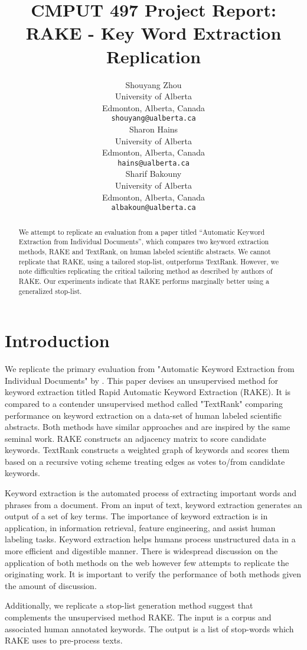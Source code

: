 \documentclass[11pt,a4paper]{article}
\title{CMPUT 497 Project Report: \\ RAKE - Key Word Extraction Replication}
\author{Shouyang Zhou \\
  University of Alberta \\
  Edmonton, Alberta, Canada \\
  {\tt shouyang@ualberta.ca} \\\And
  Sharon Hains \\
  University of Alberta \\
  Edmonton, Alberta, Canada \\
  {\tt hains@ualberta.ca} \\\And
  Sharif Bakouny\\
  University of Alberta \\
  Edmonton, Alberta, Canada \\
  {\tt albakoun@ualberta.ca} \\}
\date{}
\begin{document}
\maketitle

\begin{abstract}
We attempt to replicate an evaluation from a paper titled  “Automatic Keyword Extraction from Individual Documents”, which compares two keyword extraction methods, RAKE and TextRank, on human labeled scientific abstracts. We cannot replicate that RAKE, using a tailored stop-list, outperforms TextRank. However, we note difficulties replicating the critical tailoring method as described by authors of RAKE. Our experiments indicate that RAKE performs marginally better using a generalized stop-list. 	
\end{abstract}

\section{Introduction}

We replicate the primary evaluation from "Automatic Keyword Extraction from Individual Documents" by \citet{1}. This paper devises an unsupervised method for keyword extraction titled Rapid Automatic Keyword Extraction (RAKE). It is compared to a contender unsupervised method called "TextRank" comparing performance on keyword extraction on a data-set of human labeled scientific abstracts. Both methods have similar approaches and are inspired by the same seminal work. RAKE constructs an adjacency matrix to score candidate keywords. TextRank constructs a weighted graph of keywords and scores them based on a recursive voting scheme treating edges as votes to/from candidate keywords.

Keyword extraction is the automated process of extracting important words and phrases from a document. From an input of text, keyword extraction generates an output of a set of key terms. The importance of keyword extraction is in application, in information retrieval, feature engineering, and assist human labeling tasks. Keyword extraction helps humans process unstructured data in a more efficient and digestible manner. There is widespread discussion on the application of both methods on the web however few attempts to replicate the originating work. It is important to verify the performance of both methods given the amount of discussion.  

Additionally, we replicate a stop-list generation method \citet{1} suggest that complements the unsupervised method RAKE. The input is a corpus and associated human annotated keywords. The output is a list of stop-words which RAKE uses to pre-process texts. 
\end{document}
